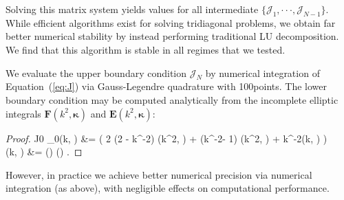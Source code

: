 \documentclass[modern]{aastex62}
\newcommand{\STARRYQUADPOINTS}{100}
\newcommand{\kap}{\boldsymbol{\kappa}}
\newcommand{\kmt}{k^{-2}}
\begin{document}
%
Solving this matrix system yields values for all
intermediate $\{ \mathcal{J}_1, {\cdot\cdot\cdot}, \mathcal{J}_{N - 1} \}$.
While efficient algorithms exist for solving tridiagonal problems, we obtain
far better numerical stability by instead performing traditional LU
decomposition. We find that this algorithm is stable in all regimes that we
tested.

We evaluate the upper boundary condition $\mathcal{J}_{N}$ by numerical
integration of Equation~(\ref{eq:J}) via Gauss-Legendre quadrature with
\STARRYQUADPOINTS points. The lower boundary condition may be computed
analytically from the incomplete elliptic integrals $\mathbf{F}(k^2, \kap)$
and $\mathbf{E}(k^2, \kap)$:
%
\begin{proof}{J0}
    \label{eq:J0}
    _0(k, \kap) &=
     \bigg(
    2 (2 - \kmt) \Delta {}(k^2, \kap) +
    (\kmt - 1) \Delta {}(k^2, \kap) +
    \kmt \Delta {}(k, \kap)
    \bigg)
    \nonumber \\
    (k, \boldsymbol{\kappa}) &=
    \sin\left(\frac{\kap}{2}\right)
    \cos\left(\frac{\kap}{2}\right)
    \sqrt{1 - \kmt \sin^2\left(\frac{\kap}{2}\right)}
    \quad.
\end{proof}
%
However, in practice we achieve better numerical precision via numerical
integration (as above), with negligible effects on computational performance.


\end{document}
